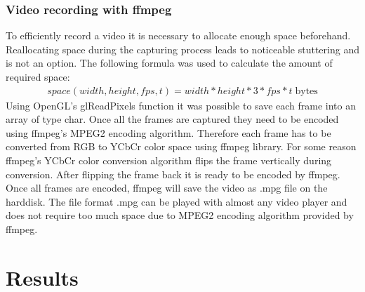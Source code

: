 \documentclass[11pt,a4paper,twoside,openright]{report}
\begin{document}
\subsection{Video recording with ffmpeg}
To efficiently record a video it is necessary to allocate enough space beforehand. Reallocating space during the capturing process leads to noticeable stuttering and is not an option. The following formula was used to calculate the amount of required space:
\begin{align*}
space(width, height, fps, t) = width * height * 3 * fps * t \; \mathrm{bytes}
\end{align*}
Using OpenGL's glReadPixels function it was possible to save each frame into an array of type char. Once all the frames are captured they need to be encoded using ffmpeg's MPEG2 encoding algorithm. Therefore each frame has to be converted from RGB to YCbCr color space using ffmpeg library. For some reason ffmpeg's YCbCr color conversion algorithm flips the frame vertically during conversion. After flipping the frame back it is ready to be encoded by ffmpeg. Once all frames are encoded, ffmpeg will save the video as .mpg file on the harddisk. The file format .mpg can be played with almost any video player and does not require too much space due to MPEG2 encoding algorithm provided by ffmpeg.

\chapter{Results}
\label{sec:results}
\end{document}
